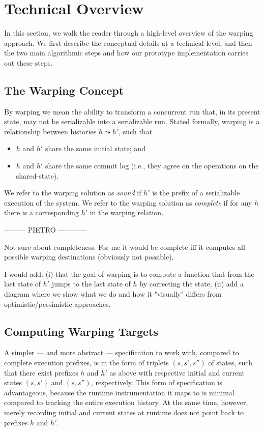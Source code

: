 \section{Technical Overview}

In this section, we walk the reader through a high-level overview of the warping approach. We first describe the conceptual details at a technical level, and then the two main algorithmic steps and how our prototype implementation carries out these steps.

\subsection{The Warping Concept}

By warping we mean the ability to transform a concurrent run that, in its present state, may not be serializable into a serializable run. Stated formally, warping is a relationship between histories $h \leadsto h'$, such that
\begin{itemize}
	\item $h$ and $h'$ share the same initial state; and
	\item $h$ and $h'$ share the same commit log (i.e., they agree on the operations on the shared-state).
\end{itemize} 

We refer to the warping solution as \emph{sound} if $h'$ is the prefix of a serializable execution of the system. We refer to the warping solution as \emph{complete} if for any $h$ there is a corresponding $h'$ in the warping relation.

--------- PIETRO ------------

Not sure about completeness. For me it would be complete iff it computes all possible warping destinations (obviously not possible).

I would add: (i) that the goal of warping is to compute a function that from the last state of $h'$ jumps to the last state of $h$ by correcting the state, (ii) add a diagram where we show what we do and how it "visually" differs from optimistic/pessimistic approaches.


\subsection{Computing Warping Targets}

A simpler --- and more abstract --- specification to work with, compared to complete execution prefixes, is in the form of triplets $(s,s',s'')$ of states, such that there exist prefixes $h$ and $h'$ as above with respective initial and current states $(s,s')$ and $(s,s'')$, respectively. This form of specification is advantageous, because the runtime instrumentation it maps to is minimal compared to tracking the entire execution history. At the same time, however, merely recording initial and current states at runtime does not point back to prefixes $h$ and $h'$.

